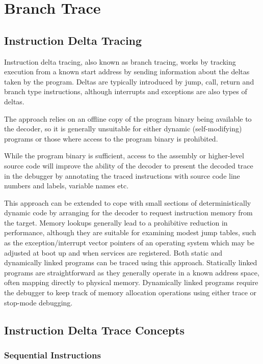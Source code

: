 \chapter{Branch Trace} \label{Branch Trace}


\section{Instruction Delta Tracing} \label{Delta Tracing}

Instruction delta tracing, also known as branch tracing, works by
tracking execution from a known start address by sending information
about the deltas taken by the program. Deltas are typically introduced
by jump, call, return and branch type instructions, although
interrupts and exceptions are also types of deltas.

The approach relies on
an offline copy of the program binary being available to the decoder, so it
is generally unsuitable for either dynamic (self-modifying) programs
or those where access to the program binary is prohibited.

While the program binary is sufficient, access to the assembly or
higher-level source code will improve the ability of the decoder to present
the decoded trace in the debugger by annotating the traced instructions with
source code line numbers and labels, variable names etc.

This approach can be extended to cope with small sections of
deterministically dynamic code by arranging for the decoder to request
instruction memory from the target. Memory lookups generally lead to a
prohibitive reduction in performance, although they are suitable for
examining modest jump tables, such as the exception/interrupt vector
pointers of an operating system which may be adjusted at boot up and
when services are registered.  Both static and dynamically linked
programs can be traced using this approach. Statically linked programs
are straightforward as they generally operate in a known address
space, often mapping directly to physical memory. Dynamically linked
programs require the debugger to keep track of memory allocation
operations using either trace or stop-mode debugging.

\section{Instruction Delta Trace Concepts} \label{Trace Concepts}

\subsection{Sequential Instructions} \label{Sequential Instructions}

